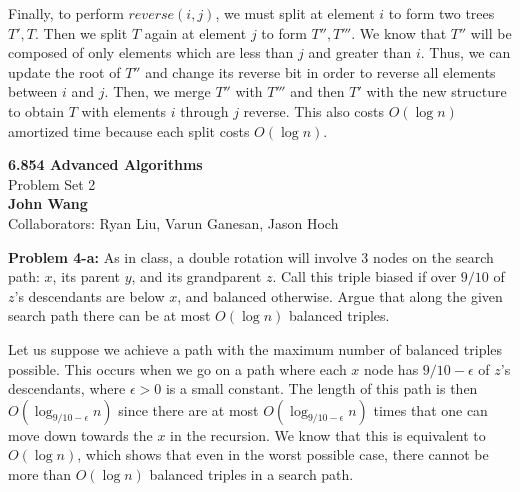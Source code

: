 \documentclass[psamsfonts]{amsart}
\newenvironment{sol}{\vspace{0.25cm}{\large \bfseries Solution:}}{\qedsymbol}
\newenvironment{prob}[1]{\begin{framed}{\large \bfseries Problem #1:}}{\end{framed}}
\newcommand{\makenewtitle}{
\begin{center}
{\huge \bfseries 6.854 Advanced Algorithms} \\
Problem Set 2\\
\vspace{0.25cm}
{\bfseries John Wang} \\
Collaborators: Ryan Liu, Varun Ganesan, Jason Hoch
\end{center}
\vspace{0.5cm}
}
\begin{document}
\begin{sol}
Finally, to perform $reverse(i,j)$, we must split at element $i$ to form two trees $T', T$. Then we split $T$ again at element $j$ to form $T'', T'''$. We know that $T''$ will be composed of only elements which are less than $j$ and greater than $i$. Thus, we can update the root of $T''$ and change its reverse bit in order to reverse all elements between $i$ and $j$. Then, we merge $T''$ with $T'''$ and then $T'$ with the new structure to obtain $T$ with elements $i$ through $j$ reverse. This also costs $O(\log n)$ amortized time because each split costs $O(\log n)$. 
\end{sol}

\newpage
\makenewtitle

\begin{prob}{4-a}
As in class, a double rotation will involve 3 nodes on the search path: $x$, its parent $y$, and its grandparent $z$. Call this triple biased if over $9/10$ of $z$'s descendants are below $x$, and balanced otherwise. Argue that along the given search path there can be at most $O(\log n)$ balanced triples.
\end{prob}
\begin{sol}
Let us suppose we achieve a path with the maximum number of balanced triples possible. This occurs when we go on a path where each $x$ node has $9/10 - \epsilon$ of $z$'s descendants, where $\epsilon > 0$ is a small constant. The length of this path is then $O(\log_{9/10-\epsilon}n)$ since there are at most $O(\log_{9/10 - \epsilon}n)$ times that one can move down towards the $x$ in the recursion. We know that this is equivalent to $O(\log n)$, which shows that even in the worst possible case, there cannot be more than $O(\log n)$ balanced triples in a search path.
\end{sol}
\end{document}
